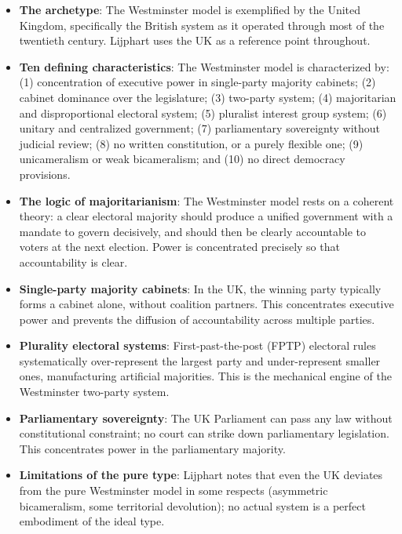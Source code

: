 \documentclass[12pt]{article}
\begin{document}
\begin{itemize}[leftmargin=*, itemsep=4pt]
    \item \textbf{The archetype}: The Westminster model is exemplified by the United Kingdom, specifically the British system as it operated through most of the twentieth century. Lijphart uses the UK as a reference point throughout.
    \item \textbf{Ten defining characteristics}: The Westminster model is characterized by: (1) concentration of executive power in single-party majority cabinets; (2) cabinet dominance over the legislature; (3) two-party system; (4) majoritarian and disproportional electoral system; (5) pluralist interest group system; (6) unitary and centralized government; (7) parliamentary sovereignty without judicial review; (8) no written constitution, or a purely flexible one; (9) unicameralism or weak bicameralism; and (10) no direct democracy provisions.
    \item \textbf{The logic of majoritarianism}: The Westminster model rests on a coherent theory: a clear electoral majority should produce a unified government with a mandate to govern decisively, and should then be clearly accountable to voters at the next election. Power is concentrated precisely so that accountability is clear.
    \item \textbf{Single-party majority cabinets}: In the UK, the winning party typically forms a cabinet alone, without coalition partners. This concentrates executive power and prevents the diffusion of accountability across multiple parties.
    \item \textbf{Plurality electoral systems}: First-past-the-post (FPTP) electoral rules systematically over-represent the largest party and under-represent smaller ones, manufacturing artificial majorities. This is the mechanical engine of the Westminster two-party system.
    \item \textbf{Parliamentary sovereignty}: The UK Parliament can pass any law without constitutional constraint; no court can strike down parliamentary legislation. This concentrates power in the parliamentary majority.
    \item \textbf{Limitations of the pure type}: Lijphart notes that even the UK deviates from the pure Westminster model in some respects (asymmetric bicameralism, some territorial devolution); no actual system is a perfect embodiment of the ideal type.
\end{itemize}

\end{document}
